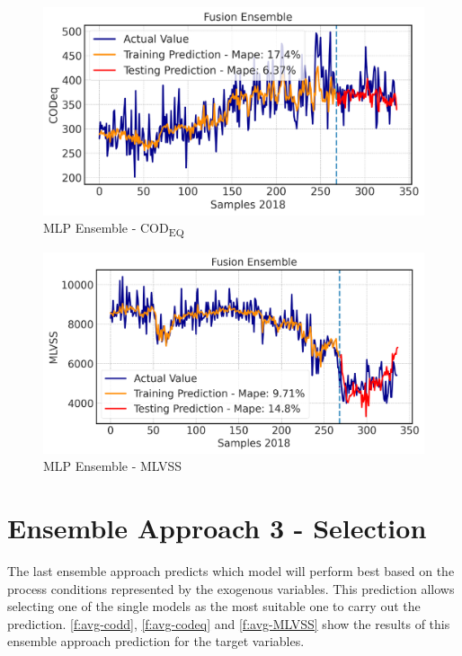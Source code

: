 \begin{figure}[h]
\centering
\includegraphics[width=\linewidth]{figures/Ch5/CODeq-ann.pdf}
\caption{MLP Ensemble - COD\textsubscript{EQ}}
\label{f:ann-codeq}
\end{figure}

\begin{figure}[h]
\centering
\includegraphics[width=\linewidth]{figures/Ch5/MVLSS-E_ann.pdf}
\caption{MLP Ensemble - MLVSS}
\label{f:ann-MLVSS}
\end{figure}

\section{Ensemble Approach 3 - Selection}
The last ensemble approach predicts which model will perform best based on the process conditions represented by the exogenous variables. This prediction allows selecting one of the single models as the most suitable one to carry out the prediction. \autoref{f:avg-codd}, \autoref{f:avg-codeq} and \autoref{f:avg-MLVSS} show the results of this ensemble approach prediction for the target variables. 

